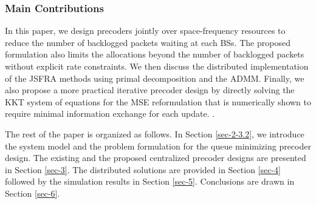 \subsubsection*{Main Contributions}
In this paper, we design precoders jointly over space-frequency resources to reduce the number of backlogged packets waiting at each \acp{BS}. The proposed formulation also limits the allocations beyond the number of backlogged packets without explicit rate constraints.  We then discuss the distributed implementation of the \ac{JSFRA} methods using primal decomposition and the \ac{ADMM}. Finally, we also propose a more practical iterative precoder design by directly solving the \ac{KKT} system of equations for the \ac{MSE} reformulation that is numerically shown to require minimal information exchange for each update. .

The rest of the paper is organized as follows. In Section \ref{sec-2-3.2}, we introduce the system model and the problem formulation for the queue minimizing precoder design. The existing and the proposed centralized precoder designs are presented in Section \ref{sec-3}. The distributed solutions are provided in Section \ref{sec-4} followed by the simulation results in Section \ref{sec-5}. Conclusions are drawn in Section \ref{sec-6}.